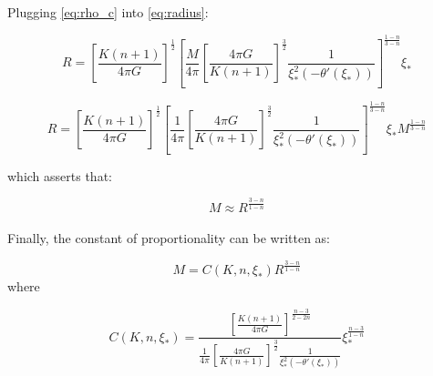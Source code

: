 \documentclass[letterpaper,12pt]{article}
\begin{document}
Plugging \eqref{eq:rho_c} into \eqref{eq:radius}:

\begin{equation*}
    R = \left[\frac{K \left(n+1\right)}{4 \pi G}\right]^{\frac{1}{2}} \left[\frac{M}{4 \pi} \left[\frac{4 \pi G}{K \left(n+1\right)}\right]^{\frac{3}{2}}  \frac{1}{\xi_*^2\left(-\theta'(\xi_*)\right)}\right]^{\frac{1-n}{3-n}} \xi_* 
\end{equation*}

\begin{equation*}
    R =  \left[\frac{K \left(n+1\right)}{4 \pi G}\right]^{\frac{1}{2}} \left[\frac{1}{4 \pi} \left[\frac{4 \pi G}{K \left(n+1\right)}\right]^{\frac{3}{2}}  \frac{1}{\xi_*^2\left(-\theta'(\xi_*)\right)}\right]^{\frac{1-n}{3-n}} \xi_* M^{\frac{1-n}{3-n}} 
\end{equation*}

which asserts that:

\begin{equation*}
    M \approx R^{\frac{3-n}{1-n}}
\end{equation*}

\paragraph{} Finally, the constant of proportionality can be written as:

\begin{equation*}
    M = C(K, n, \xi_*) R^{\frac{3-n}{1-n}} 
\end{equation*}
where 

\begin{equation*}
  \boxed{  C(K, n, \xi_*) = \frac{ \left[\frac{K \left(n+1\right)}{4 \pi G}\right]^{\frac{n-3}{2 - 2n}} }{\frac{1}{4 \pi} \left[\frac{4 \pi G}{K \left(n+1\right)}\right]^{\frac{3}{2}}  \frac{1}{\xi_*^2\left(-\theta'(\xi_*)\right)}} \xi_*^{\frac{n-3}{1-n}} }
\end{equation*}
\end{document}
